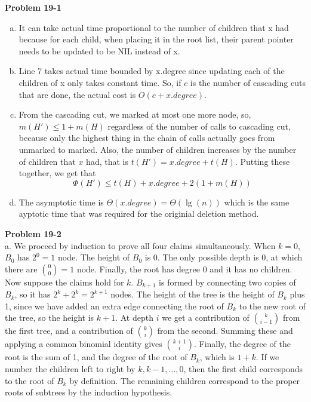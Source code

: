 \documentclass{article}
\begin{document}
\noindent\textbf{Problem 19-1}\\

\begin{enumerate}[a.]
\item It can take actual time proportional to the number of children that x had because for each child, when placing it in the root list, their parent pointer needs to be updated to be NIL instead of x.

\item Line 7 takes actual time bounded by x.degree since updating each of the children of x only takes constant time. So, if $c$ is the number of cascading cuts that are done, the actual cost is $O(c+x.degree)$.

\item From the cascading cut, we marked at most one more node, so, $m(H') \le 1 + m(H)$ regardless of the number of calls to cascading cut, because only the highest thing in the chain of calls actually goes from unmarked to marked. Also, the number of children increases by the number of children that $x$ had, that is $t(H') = x.degree + t(H)$. Putting these together, we get that
\[
\Phi(H') \le t(H)+ x.degree + 2(1+m(H))
\]

\item The asymptotic time is $\Theta(x.degree) = \Theta(\lg(n))$ which is the same ayptotic time that was required for the originial deletion method.

\end{enumerate}

\noindent\textbf{Problem 19-2}\\

a. We proceed by induction to prove all four claims simultaneously.  When $k=0$, $B_0$ has $2^0 = 1$ node. The height of $B_0$ is 0. The only possible depth is 0, at which there are ${0 \choose 0} = 1$ node.  Finally, the root has degree 0 and it has no children.  Now suppose the claims hold for $k$.  $B_{k+1}$ is formed by connecting two copies of $B_k$, so it has $2^k + 2^k = 2^{k+1}$ nodes. The height of the tree is the height of $B_k$ plus 1, since we have added an extra edge connecting the root of $B_k$ to the new root of the tree, so the height is $k+1$.  At depth $i$ we get a contribution of ${k \choose i-1}$ from the first tree, and a contribution of ${k \choose i}$ from the second.  Summing these and applying a common binomial identity gives ${k+1 \choose i}$. Finally, the degree of the root is the sum of 1, and the degree of the root of $B_k$, which is $1+ k$. If we number the children left to right by $k, k-1, \ldots, 0$, then the first child corresponds to the root of $B_k$ by definition. The remaining children correspond to the proper roots of subtrees by the induction hypothesis. \\
\end{document}
